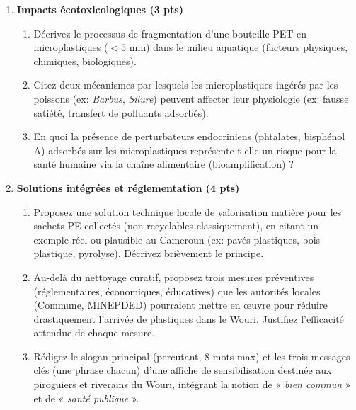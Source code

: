 \documentclass[11pt]{article}
\begin{document}
\begin{exercice}
\begin{enumerate}
    \item \textbf{Impacts écotoxicologiques (3 pts)}
    \begin{enumerate}
        \item Décrivez le processus de fragmentation d'une bouteille PET en microplastiques ($< 5$ mm) dans le milieu aquatique (facteurs physiques, chimiques, biologiques).
        \item Citez deux mécanismes par lesquels les microplastiques ingérés par les poissons (ex: \emph{Barbus}, \emph{Silure}) peuvent affecter leur physiologie (ex: fausse satiété, transfert de polluants adsorbés).
        \item En quoi la présence de perturbateurs endocriniens (phtalates, bisphénol A) adsorbés sur les microplastiques représente-t-elle un risque pour la santé humaine via la chaîne alimentaire (bioamplification) ?
    \end{enumerate}

    \item \textbf{Solutions intégrées et réglementation (4 pts)}
    \begin{enumerate}
        \item Proposez une solution technique locale de valorisation matière pour les sachets PE collectés (non recyclables classiquement), en citant un exemple réel ou plausible au Cameroun (ex: pavés plastiques, bois plastique, pyrolyse). Décrivez brièvement le principe.
        \item Au-delà du nettoyage curatif, proposez trois mesures préventives (réglementaires, économiques, éducatives) que les autorités locales (Commune, MINEPDED) pourraient mettre en œuvre pour réduire drastiquement l'arrivée de plastiques dans le Wouri. Justifiez l'efficacité attendue de chaque mesure.
        \item Rédigez le slogan principal (percutant, 8 mots max) et les trois messages clés (une phrase chacun) d'une affiche de sensibilisation destinée aux piroguiers et riverains du Wouri, intégrant la notion de « \emph{bien commun} » et de « \emph{santé publique} ».
    \end{enumerate}
\end{enumerate}
\end{exercice}
\end{document}
